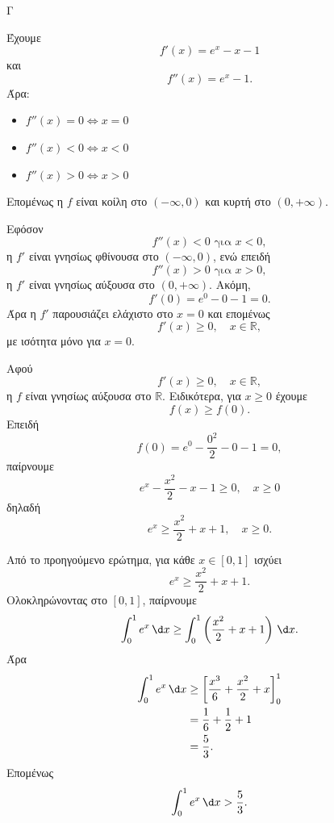 \begin{thema}{Γ}
\begin{erwthma}
\item Έχουμε
\[
f'(x)=e^x-x-1
\]
και
\[
f''(x)=e^x-1.
\]
Άρα:
\begin{itemize}
\item $f''(x)=0 \Leftrightarrow x=0$
\item $f''(x)<0 \Leftrightarrow x<0$
\item $f''(x)>0 \Leftrightarrow x>0$
\end{itemize}
Επομένως η $f$ είναι κοίλη στο $(-\infty,0)$ και κυρτή στο $(0,+\infty)$.

\item Εφόσον
\[
f''(x)<0 \text{ για } x<0,
\]
η $f'$ είναι γνησίως φθίνουσα στο $(-\infty,0)$, ενώ επειδή
\[
f''(x)>0 \text{ για } x>0,
\]
η $f'$ είναι γνησίως αύξουσα στο $(0,+\infty)$.
Ακόμη,
\[
f'(0)=e^0-0-1=0.
\]
Άρα η $f'$ παρουσιάζει ελάχιστο στο $x=0$ και επομένως
\[
f'(x)\ge 0,\quad x\in \mathbb{R},
\]
με ισότητα μόνο για $x=0$.

\item Αφού
\[
f'(x)\ge 0,\quad x\in \mathbb{R},
\]
η $f$ είναι γνησίως αύξουσα στο $\mathbb{R}$.
Ειδικότερα, για $x\ge 0$ έχουμε
\[
f(x)\ge f(0).
\]
Επειδή
\[
f(0)=e^0-\frac{0^2}{2}-0-1=0,
\]
παίρνουμε
\[
e^x-\frac{x^2}{2}-x-1\ge 0,\quad x\ge 0
\]
δηλαδή
\[
e^x\ge \frac{x^2}{2}+x+1,\quad x\ge 0.
\]

\item Από το προηγούμενο ερώτημα, για κάθε $x\in[0,1]$ ισχύει
\[
e^x\ge \frac{x^2}{2}+x+1.
\]
Ολοκληρώνοντας στο $[0,1]$, παίρνουμε
\[
\int_0^1 e^x\,\d x
\ge
\int_0^1\left(\frac{x^2}{2}+x+1\right)\,\d x.
\]
Άρα
\begin{align*}
\int_0^1 e^x\,\d x
&\ge
\left[\frac{x^3}{6}+\frac{x^2}{2}+x\right]_0^1\\
&=
\frac{1}{6}+\frac{1}{2}+1\\
&=
\frac{5}{3}.
\end{align*}
Επομένως
\[
\int_0^1 e^x\,\d x>\frac{5}{3}.
\]
\end{erwthma}
\end{thema}

